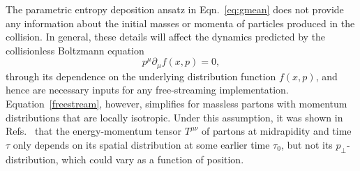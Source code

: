 \documentclass[aps,prc,reprint,amsmath,nofootinbib]{revtex4-1}
\begin{document}
The parametric entropy deposition ansatz in Eqn.~\eqref{eq:gmean} does not provide any information about the initial masses or momenta of particles produced in the collision.
In general, these details will affect the dynamics predicted by the collisionless Boltzmann equation
\begin{equation}
  \label{freestream}
  p^\mu \partial_\mu f(x, p) = 0,
\end{equation}
through its dependence on the underlying distribution function $f(x, p)$, and hence are necessary inputs for any free-streaming implementation.
Equation~\eqref{freestream}, however, simplifies for massless partons with momentum distributions that are locally isotropic.
Under this assumption, it was shown in Refs.~\cite{Broniowski:2008qk, Liu:2015nwa} that the energy-momentum tensor $T^{\mu\nu}$ of partons at midrapidity and time $\tau$ only depends on its spatial distribution at some earlier time $\tau_0$, but not its $p_\perp$-distribution, which could vary as a function of position.
\end{document}
